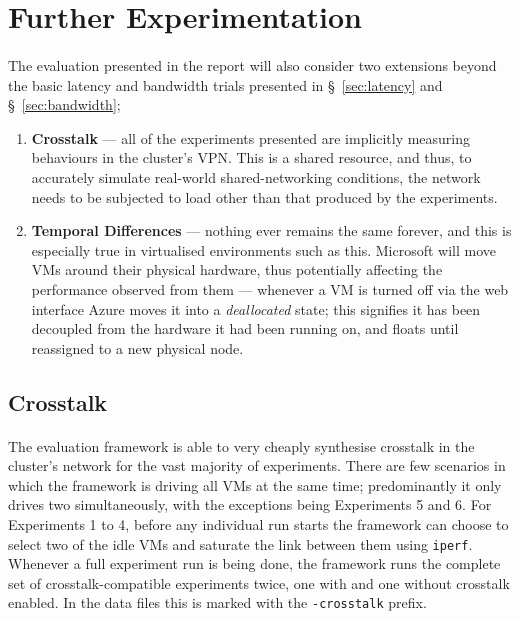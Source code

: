 \documentclass[a4paper,10pt]{article}
\begin{document}
\clearpage
\section{Further Experimentation}

\paragraph{} The evaluation presented in the report will also consider two extensions beyond the basic latency and bandwidth trials presented in §~\ref{sec:latency} and §~\ref{sec:bandwidth};

\begin{enumerate}
    \item \textbf{Crosstalk} --- all of the experiments presented are implicitly measuring behaviours in the cluster's VPN. This is a shared resource, and thus, to accurately simulate real-world shared-networking conditions, the network needs to be subjected to load other than that produced by the experiments.
    \item \textbf{Temporal Differences} --- nothing ever remains the same forever, and this is especially true in virtualised environments such as this. Microsoft will move VMs around their physical hardware, thus potentially affecting the performance observed from them --- whenever a VM is turned off via the web interface Azure moves it into a \textit{deallocated} state; this signifies it has been decoupled from the hardware it had been running on, and floats until reassigned to a new physical node.
\end{enumerate}

\subsection*{Crosstalk}
\paragraph{} The evaluation framework is able to very cheaply synthesise crosstalk in the cluster's network for the vast majority of experiments. There are few scenarios in which the framework is driving all VMs at the same time; predominantly it only drives two simultaneously, with the exceptions being Experiments 5 and 6. For Experiments 1 to 4, before any individual run starts the framework can choose to select two of the idle VMs and saturate the link between them using \texttt{iperf}. Whenever a full experiment run is being done, the framework runs the complete set of crosstalk-compatible experiments twice, one with and one without crosstalk enabled. In the data files this is marked with the \texttt{-crosstalk} prefix.
\end{document}
